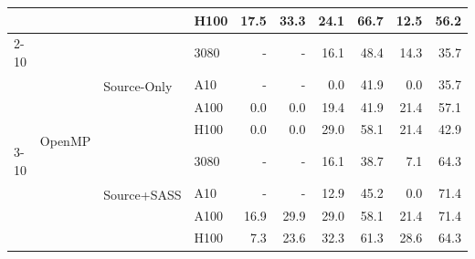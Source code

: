 \begin{tabular}{@{}llllrrrrrr@{}}
 &  &  & H100 & \cellcolor[rgb]{1.000,0.939,0.939}17.5 & \cellcolor[rgb]{1.000,0.828,0.828}33.3 & \cellcolor[rgb]{1.000,0.897,0.897}24.1 & \cellcolor[rgb]{1.000,0.477,0.477}66.7 & \cellcolor[rgb]{1.000,0.964,0.964}12.5 & \cellcolor[rgb]{1.000,0.602,0.602}56.2 \\
\cmidrule(lr){2-10}
 & \multirow{8}{*}{OpenMP} & \multirow{4}{*}{Source-Only} & 3080 & \cellcolor[rgb]{1.000,1.000,1.000}- & \cellcolor[rgb]{1.000,1.000,1.000}- & \cellcolor[rgb]{1.000,0.946,0.946}16.1 & \cellcolor[rgb]{1.000,0.687,0.687}48.4 & \cellcolor[rgb]{1.000,0.955,0.955}14.3 & \cellcolor[rgb]{1.000,0.808,0.808}35.7 \\
 &  &  & A10 & \cellcolor[rgb]{1.000,1.000,1.000}- & \cellcolor[rgb]{1.000,1.000,1.000}- & \cellcolor[rgb]{1.000,1.000,1.000}0.0 & \cellcolor[rgb]{1.000,0.751,0.751}41.9 & \cellcolor[rgb]{1.000,1.000,1.000}0.0 & \cellcolor[rgb]{1.000,0.808,0.808}35.7 \\
 &  &  & A100 & \cellcolor[rgb]{1.000,1.000,1.000}0.0 & \cellcolor[rgb]{1.000,1.000,1.000}0.0 & \cellcolor[rgb]{1.000,0.927,0.927}19.4 & \cellcolor[rgb]{1.000,0.751,0.751}41.9 & \cellcolor[rgb]{1.000,0.915,0.915}21.4 & \cellcolor[rgb]{1.000,0.592,0.592}57.1 \\
 &  &  & H100 & \cellcolor[rgb]{1.000,1.000,1.000}0.0 & \cellcolor[rgb]{1.000,1.000,1.000}0.0 & \cellcolor[rgb]{1.000,0.862,0.862}29.0 & \cellcolor[rgb]{1.000,0.581,0.581}58.1 & \cellcolor[rgb]{1.000,0.915,0.915}21.4 & \cellcolor[rgb]{1.000,0.742,0.742}42.9 \\
\cmidrule(lr){3-10}
 &  & \multirow{4}{*}{Source+SASS} & 3080 & \cellcolor[rgb]{1.000,1.000,1.000}- & \cellcolor[rgb]{1.000,1.000,1.000}- & \cellcolor[rgb]{1.000,0.946,0.946}16.1 & \cellcolor[rgb]{1.000,0.781,0.781}38.7 & \cellcolor[rgb]{1.000,0.985,0.985}7.1 & \cellcolor[rgb]{1.000,0.507,0.507}64.3 \\
 &  &  & A10 & \cellcolor[rgb]{1.000,1.000,1.000}- & \cellcolor[rgb]{1.000,1.000,1.000}- & \cellcolor[rgb]{1.000,0.962,0.962}12.9 & \cellcolor[rgb]{1.000,0.719,0.719}45.2 & \cellcolor[rgb]{1.000,1.000,1.000}0.0 & \cellcolor[rgb]{1.000,0.417,0.417}71.4 \\
 &  &  & A100 & \cellcolor[rgb]{1.000,0.942,0.942}16.9 & \cellcolor[rgb]{1.000,0.855,0.855}29.9 & \cellcolor[rgb]{1.000,0.862,0.862}29.0 & \cellcolor[rgb]{1.000,0.581,0.581}58.1 & \cellcolor[rgb]{1.000,0.915,0.915}21.4 & \cellcolor[rgb]{1.000,0.417,0.417}71.4 \\
 &  &  & H100 & \cellcolor[rgb]{1.000,0.985,0.985}7.3 & \cellcolor[rgb]{1.000,0.901,0.901}23.6 & \cellcolor[rgb]{1.000,0.836,0.836}32.3 & \cellcolor[rgb]{1.000,0.543,0.543}61.3 & \cellcolor[rgb]{1.000,0.865,0.865}28.6 & \cellcolor[rgb]{1.000,0.507,0.507}64.3 \\

\end{tabular}
